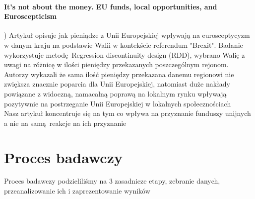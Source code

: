 \documentclass[12pt]{article}
\begin{document}
\paragraph{It’s not about the money. EU funds, local opportunities, and Euroscepticism})
Artykuł opisuje jak pieniądze z Unii Europejskiej wpływają na eurosceptycyzm w danym kraju na podstawie Walii w kontekście referendum "Brexit". 
Badanie wykorzystuje metodę Regression discontinuity design (RDD), wybrano Walię z uwagi na różnicę w ilości pieniędzy przekazanych poszczególnym rejonom. 
Autorzy wykazali że sama ilość pieniędzy przekazana danemu 
regionowi nie zwiększa znacznie poparcia dla 
Unii Europejskiej, natomiast duże nakłady powiązane z 
widoczną, namacalną poprawą na lokalnym rynku wpływają 
pozytywnie na postrzeganie Unii Europejskiej w lokalnych 
społecznościach \cite{6} \\ 
Nasz artykuł koncentruje się na tym co wpływa na przyznanie funduszy unijnych a nie na samą reakcje na ich przyznanie 
\section{Proces badawczy}
Proces badawczy podzieliliśmy na 3 zasadnicze etapy, zebranie danych, przeanalizowanie ich i zaprezentowanie wyników
\end{document}

